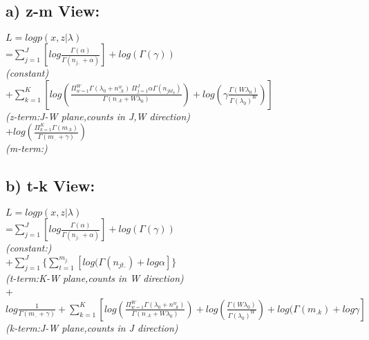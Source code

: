 \documentclass{article}
\begin{document}
\begin{spacing}{1.1}
\subsection{a) z-m View:}
$L=log p(x,z|\lambda)$
\\ =$ \sum_{j=1}^{J} [log \frac{\Gamma(\alpha)}{\Gamma(n_{j..}+\alpha)}]+log(\Gamma(\gamma))$\\ \emph{{\small(constant)}}\\ 
+$ \sum_{k=1}^{K} [log(\frac{\Pi_{w=1}^{W}\Gamma(\lambda_{0}+n_{..k}^{w})\ \Pi_{j=1}^{J}\alpha\Gamma(n_{jkt_{k}})}{\Gamma(n_{..k}+W\lambda_{0})})+log(\gamma \frac{\Gamma(W\lambda_{0})}{\Gamma(\lambda_{0})^{W}})]$\\\emph{{\small(z-term:J-W plane,counts in J,W direction)}} \\
+$log(\frac{\Pi_{k=1}^{K}\Gamma(m_{.k})}{\Gamma(m_{..}+\gamma)})$\\\emph{{\small(m-term:)}}
\subsection{b) t-k View:}
$L=log p(x,z|\lambda)$
\\ =$ \sum_{j=1}^{J} [log \frac{\Gamma(\alpha)}{\Gamma(n_{j..}+\alpha)}]+log(\Gamma(\gamma))$\\\emph{{\small(constant:)}}\\ 
+$ \sum_{j=1}^{J} \{\sum_{t=1}^{m_{j.}}[log(\Gamma(n_{jt.})+log \alpha]\}$\\\emph{{\small(t-term:K-W plane,counts in W direction)}}\\
+$ log \frac{1}{\Gamma(m_{..}+\gamma)}+\sum_{k=1}^{K} [log(\frac{\Pi_{w=1}^{W}\Gamma(\lambda_{0}+n_{..k}^{w})}{\Gamma(n_{..k}+W\lambda_{0})})+log(\frac{\Gamma(W\lambda_{0})}{\Gamma(\lambda_{0})^{W}})+log(\Gamma(m_{.k})+log \gamma]$\\ \emph{{\small(k-term:J-W plane,counts in J direction)}}

\begin{comment}
\newpage
\section{2)Moves for t-k View:}
Since the Object Function is a NP hard combinatoric problem, we hope to use greedy method to approximate the global optima by parts.

\end{comment}
\end{spacing}
\end{document}
